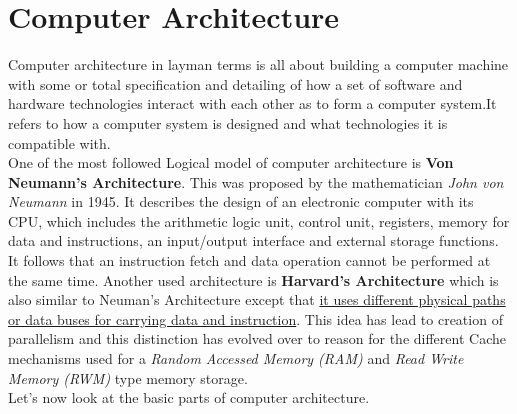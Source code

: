 \chapter{Computer Architecture}
\graphicspath{ {./images/} }


Computer architecture in layman terms is all about building a computer machine with some or total specification and detailing of how a set of software and hardware technologies interact with each other as to form a computer system.It refers to how a computer system is designed and what technologies it is compatible with.\\

One of the most followed Logical model of computer architecture is \textbf{Von Neumann's Architecture}\cite{vonneumanarch}. This was proposed by the mathematician \textit{John von Neumann} in 1945. It describes the design of an electronic computer with its CPU, which includes the arithmetic logic unit, control unit, registers, memory for data and instructions, an input/output interface and external storage functions. It follows that an instruction fetch and data operation cannot be performed at the same time. Another used architecture is \textbf{Harvard's Architecture}\cite{harvardarch} which is also similar to Neuman's Architecture except that \underline{it uses different physical paths or data buses for carrying data and instruction}. This idea has lead to creation of parallelism and this distinction has evolved over to reason for the different Cache mechanisms used for a \textit{Random Accessed Memory (RAM)} and \textit{Read Write Memory (RWM)} type memory storage.\\

Let's now look at the basic parts of computer architecture.\\   



